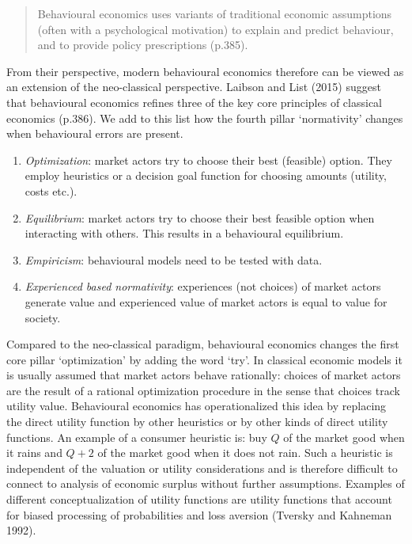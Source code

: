 \documentclass[
]{book}
\providecommand{\tightlist}{%
  \setlength{\itemsep}{0pt}\setlength{\parskip}{0pt}}
\begin{document}
\begin{quote}
Behavioural economics uses variants of traditional economic assumptions (often with a psychological motivation) to explain and predict behaviour, and to provide policy prescriptions (p.385).
\end{quote}

From their perspective, modern behavioural economics therefore can be viewed as an extension of the neo-classical perspective. Laibson and List (2015) suggest that behavioural economics refines three of the key core principles of classical economics (p.386). We add to this list how the fourth pillar `normativity' changes when behavioural errors are present.

\begin{enumerate}
\def\labelenumi{(\roman{enumi})}
\tightlist
\item
  \emph{Optimization}: market actors try to choose their best (feasible) option. They employ heuristics or a decision goal function for choosing amounts (utility, costs etc.).
\item
  \emph{Equilibrium}: market actors try to choose their best feasible option when interacting with others. This results in a behavioural equilibrium.
\item
  \emph{Empiricism}: behavioural models need to be tested with data.
\item
  \emph{Experienced based normativity}: experiences (not choices) of market actors generate value and experienced value of market actors is equal to value for society.
\end{enumerate}

Compared to the neo-classical paradigm, behavioural economics changes the first core pillar `optimization' by adding the word `try'. In classical economic models it is usually assumed that market actors behave rationally: choices of market actors are the result of a rational optimization procedure in the sense that choices track utility value. Behavioural economics has operationalized this idea by replacing the direct utility function by other heuristics or by other kinds of direct utility functions. An example of a consumer heuristic is: buy \(Q\) of the market good when it rains and \(Q+2\) of the market good when it does not rain. Such a heuristic is independent of the valuation or utility considerations and is therefore difficult to connect to analysis of economic surplus without further assumptions. Examples of different conceptualization of utility functions are utility functions that account for biased processing of probabilities and loss aversion (Tversky and Kahneman 1992).
\end{document}
